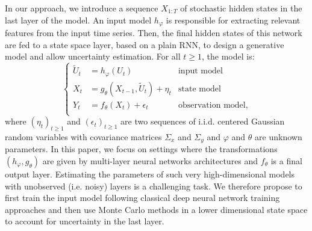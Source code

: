 \documentclass{article}
\begin{document}
In our approach, we introduce a sequence $X_{1:T}$ of stochastic hidden states in the last layer of the model. 
An input model $h_\varphi$ is responsible for extracting relevant features from the input time series. Then, the final hidden states of this network are fed to a state space layer, based on a plain RNN, to design a generative model and allow uncertainty estimation. For all $t\geq 1$, the model is:
\begin{equation*}
	\left\{
	\begin{aligned}
		\widetilde U_t & = h_\varphi(U_t)                             & \text{input model}        \\
		X_t            & = g_\theta(X_{t-1}, \widetilde U_t) + \eta_t & \text{state model}        \\
		Y_t            & = f_\theta(X_t) + \epsilon_t                 & \text{observation model,} \\
	\end{aligned}
	\right.
\end{equation*}
where $(\eta_t)_{t\geq 1}$ and $(\epsilon_t)_{t\geq 1}$ are two sequences of i.i.d. centered Gaussian random variables with covariance matrices $\Sigma_x$ and $\Sigma_y$ and $\varphi$ and $\theta$ are unknown parameters. In this paper, we focus on settings where the transformations $(h_\varphi,g_\theta)$ are given by multi-layer neural networks architectures and $f_\theta$ is a final output layer. Estimating the parameters of such very high-dimensional models with unobserved (i.e. noisy) layers is a challenging task. We therefore propose to first train the input model following classical deep neural network training approaches and then use Monte Carlo methods in a lower dimensional state space to account for uncertainty in the last layer.
\end{document}
